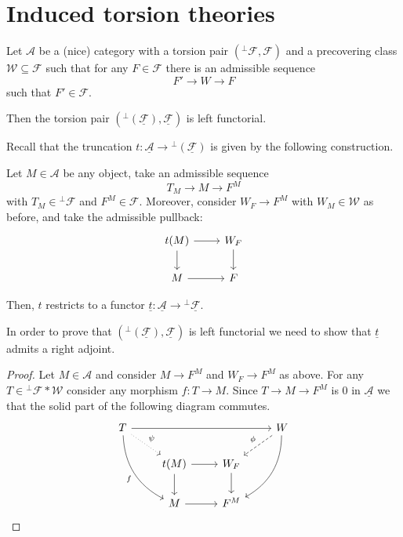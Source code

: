 \clearpage

\section{Induced torsion theories}
\begin{lemma}
  Let $\mathcal{A}$ be a (nice) category with a torsion pair $(^\perp\mathcal{F}, \mathcal{F})$ and a precovering class
  $\mathcal{W}\subseteq \mathcal{F}$ such that for any $F\in\mathcal{F}$ there is an admissible
  sequence
  \begin{equation*}
    F'\to W\to F
  \end{equation*}
  such that $F'\in\mathcal{F}$.

  Then the torsion pair $(^\perp(\underline{\mathcal{F}}),\underline{\mathcal{F}})$ is left functorial.
\end{lemma}

Recall that the truncation $t:\underline{\mathcal{A}}\to {^\perp(\underline{\mathcal{F}})}$ is given by the following construction.

Let $M\in\mathcal{A}$ be any object, take an admissible sequence
\begin{equation*}
  T_M\to M\to F^M
\end{equation*}
with $T_M\in{^\perp\mathcal{F}}$ and $F^M\in\mathcal{F}$. Moreover, consider $W_F\to F^M$ with $W_M\in\mathcal{W}$
as before, and take the admissible pullback:
\begin{equation*}
  \begin{tikzcd}
    t(M)\arrow{d}\arrow{r}&W_F\arrow{d}\\
    M\arrow{r}&F
  \end{tikzcd}
\end{equation*}

Then, $t$ restricts to a functor $\underline{t}:\underline{\mathcal{A}}\to {^\perp\underline{\mathcal{F}}}$.

In order to prove that $(^\perp(\underline{\mathcal{F}}),\underline{\mathcal{F}})$ is left functorial we
need to show that $\underline{t}$ admits a right adjoint.

\begin{proof}
  Let $M\in\mathcal{A}$ and consider $M\to F^M$ and $W_F\to F^M$ as above.
  For any $T\in{^\perp\mathcal{F}\ast \mathcal{W}}$ consider any morphism
  $f:T\to M$. Since $T\to M\to F^M$ is 0 in $\underline{\mathcal{A}}$ we that the solid part of the
  following diagram commutes.
  \begin{equation*}
    \begin{tikzcd}
      T\arrow[bend right]{ddr}[']{f}\arrow{rrr}\arrow[dotted]{dr}{\psi}
        & & & W\arrow[dashed]{ld}[']{\phi}\arrow[bend left]{ddl}
              \\
        & t(M)\arrow{r}\arrow{d}
          & W_F\arrow{d}
            & \\
        & M\arrow{r}
          & F^M
            &
    \end{tikzcd}
  \end{equation*}
\end{proof}


